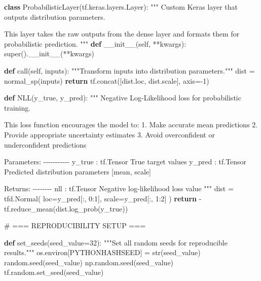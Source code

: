 \documentclass[
  letterpaper,
  DIV=11,
  numbers=noendperiod]{scrreprt}
\newenvironment{Shaded}{\begin{snugshade}}{\end{snugshade}}
\newcommand{\BuiltInTok}[1]{\textcolor[rgb]{0.00,0.23,0.31}{#1}}
\newcommand{\CommentTok}[1]{\textcolor[rgb]{0.37,0.37,0.37}{#1}}
\newcommand{\ControlFlowTok}[1]{\textcolor[rgb]{0.00,0.23,0.31}{\textbf{#1}}}
\newcommand{\DecValTok}[1]{\textcolor[rgb]{0.68,0.00,0.00}{#1}}
\newcommand{\FunctionTok}[1]{\textcolor[rgb]{0.28,0.35,0.67}{#1}}
\newcommand{\KeywordTok}[1]{\textcolor[rgb]{0.00,0.23,0.31}{\textbf{#1}}}
\newcommand{\NormalTok}[1]{\textcolor[rgb]{0.00,0.23,0.31}{#1}}
\newcommand{\OperatorTok}[1]{\textcolor[rgb]{0.37,0.37,0.37}{#1}}
\newcommand{\StringTok}[1]{\textcolor[rgb]{0.13,0.47,0.30}{#1}}
\newcommand{\VariableTok}[1]{\textcolor[rgb]{0.07,0.07,0.07}{#1}}
\begin{document}
\begin{Shaded}
\begin{Highlighting}[]
\KeywordTok{class}\NormalTok{ ProbabilisticLayer(tf.keras.layers.Layer):}
    \CommentTok{"""}
\CommentTok{    Custom Keras layer that outputs distribution parameters.}

\CommentTok{    This layer takes the raw outputs from the dense layer and}
\CommentTok{    formats them for probabilistic prediction.}
\CommentTok{    """}
    \KeywordTok{def} \FunctionTok{\_\_init\_\_}\NormalTok{(}\VariableTok{self}\NormalTok{, }\OperatorTok{**}\NormalTok{kwargs):}
        \BuiltInTok{super}\NormalTok{().}\FunctionTok{\_\_init\_\_}\NormalTok{(}\OperatorTok{**}\NormalTok{kwargs)}

    \KeywordTok{def}\NormalTok{ call(}\VariableTok{self}\NormalTok{, inputs):}
        \CommentTok{"""Transform inputs into distribution parameters."""}
\NormalTok{        dist }\OperatorTok{=}\NormalTok{ normal\_sp(inputs)}
        \ControlFlowTok{return}\NormalTok{ tf.concat([dist.loc, dist.scale], axis}\OperatorTok{={-}}\DecValTok{1}\NormalTok{)}

\KeywordTok{def}\NormalTok{ NLL(y\_true, y\_pred):}
    \CommentTok{"""}
\CommentTok{    Negative Log{-}Likelihood loss for probabilistic training.}

\CommentTok{    This loss function encourages the model to:}
\CommentTok{    1. Make accurate mean predictions}
\CommentTok{    2. Provide appropriate uncertainty estimates}
\CommentTok{    3. Avoid overconfident or underconfident predictions}

\CommentTok{    Parameters:}
\CommentTok{    {-}{-}{-}{-}{-}{-}{-}{-}{-}{-}{-}}
\CommentTok{    y\_true : tf.Tensor}
\CommentTok{        True target values}
\CommentTok{    y\_pred : tf.Tensor}
\CommentTok{        Predicted distribution parameters [mean, scale]}

\CommentTok{    Returns:}
\CommentTok{    {-}{-}{-}{-}{-}{-}{-}{-}}
\CommentTok{    nll : tf.Tensor}
\CommentTok{        Negative log{-}likelihood loss value}
\CommentTok{    """}
\NormalTok{    dist }\OperatorTok{=}\NormalTok{ tfd.Normal(}
\NormalTok{        loc}\OperatorTok{=}\NormalTok{y\_pred[:, }\DecValTok{0}\NormalTok{:}\DecValTok{1}\NormalTok{],}
\NormalTok{        scale}\OperatorTok{=}\NormalTok{y\_pred[:, }\DecValTok{1}\NormalTok{:}\DecValTok{2}\NormalTok{]}
\NormalTok{    )}
    \ControlFlowTok{return} \OperatorTok{{-}}\NormalTok{tf.reduce\_mean(dist.log\_prob(y\_true))}

\CommentTok{\# === REPRODUCIBILITY SETUP ===}

\KeywordTok{def}\NormalTok{ set\_seeds(seed\_value}\OperatorTok{=}\DecValTok{32}\NormalTok{):}
    \CommentTok{"""Set all random seeds for reproducible results."""}
\NormalTok{    os.environ[}\StringTok{\textquotesingle{}PYTHONHASHSEED\textquotesingle{}}\NormalTok{] }\OperatorTok{=} \BuiltInTok{str}\NormalTok{(seed\_value)}
\NormalTok{    random.seed(seed\_value)}
\NormalTok{    np.random.seed(seed\_value)}
\NormalTok{    tf.random.set\_seed(seed\_value)}


\end{Highlighting}
\end{Shaded}
\end{document}

